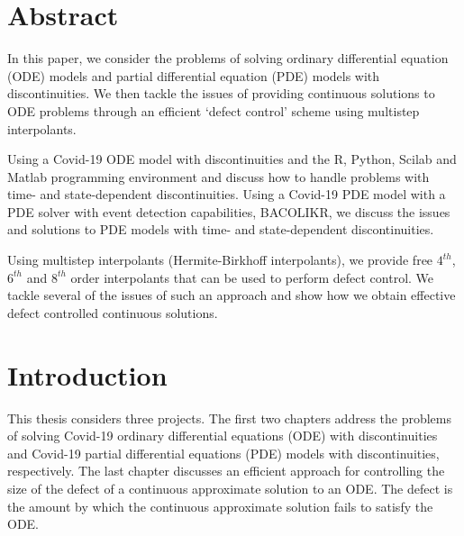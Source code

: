 \documentclass{article}
\begin{document}
\section{Abstract}
In this paper, we consider the problems of solving ordinary differential equation (ODE) models and partial differential equation (PDE) models with discontinuities. We then tackle the issues of providing continuous solutions to ODE problems through an efficient `defect control' scheme using multistep interpolants. 

Using a Covid-19 ODE model with discontinuities and the R, Python, Scilab and Matlab programming environment and discuss how to handle problems with time- and state-dependent discontinuities. Using a Covid-19 PDE model with a PDE solver with event detection capabilities, BACOLIKR, we discuss the issues and solutions to PDE models with time- and state-dependent discontinuities. 

Using multistep interpolants (Hermite-Birkhoff interpolants), we provide free $4^{th}$, $6^{th}$ and $8^{th}$ order interpolants that can be used to perform defect control. We tackle several of the issues of such an approach and show how we obtain effective defect controlled continuous solutions. 

\section{Introduction}
This thesis considers three projects. The first two chapters address the problems of solving Covid-19 ordinary differential equations (ODE) with discontinuities and Covid-19 partial differential equations (PDE) models with discontinuities, respectively. The last chapter discusses an efficient approach for controlling the size of the defect of a continuous approximate solution to an ODE. The defect is the amount by which the continuous approximate solution fails to satisfy the ODE. 
\end{document}
